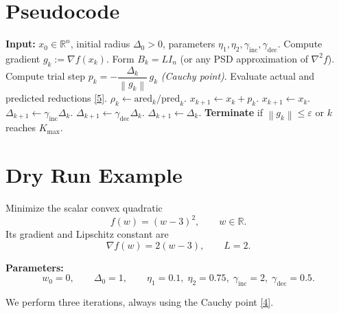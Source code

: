 \documentclass{article}
\newcommand{\norm}[1]{\left\lVert#1\right\rVert}
\newcommand{\R}{\mathbb{R}}
\begin{document}
\section*{Pseudocode}
\begin{algorithm}[H]
\caption{Trust‑Region Gradient Method (TR‑GM)}
\begin{algorithmic}[1]
\STATE \textbf{Input:} $x_{0}\in\R^{n}$, initial radius $\Delta_{0}>0$,
parameters $\eta_{1},\eta_{2},\gamma_{\text{inc}},\gamma_{\text{dec}}$.
    \STATE Compute gradient $g_{k}:=\nabla f(x_{k})$.
    \STATE Form $B_{k}=L I_{n}$ (or any PSD approximation of $\nabla^{2}f$).
    \STATE Compute trial step $p_{k}= -\dfrac{\Delta_{k}}{\norm{g_{k}}}\,g_{k}$
            \hfill\textit{(Cauchy point)}.
    \STATE Evaluate actual and predicted reductions \eqref{5}.
    \STATE $\rho_{k}\gets\text{ared}_{k}/\text{pred}_{k}$.
        \STATE $x_{k+1}\gets x_{k}+p_{k}$.
    \ELSE
        \STATE $x_{k+1}\gets x_{k}$.
    \ENDIF
        \STATE $\Delta_{k+1}\gets\gamma_{\text{inc}}\Delta_{k}$.
        \STATE $\Delta_{k+1}\gets\gamma_{\text{dec}}\Delta_{k}$.
    \ELSE
        \STATE $\Delta_{k+1}\gets\Delta_{k}$.
    \ENDIF
    \STATE \textbf{Terminate} if $\norm{g_{k}}\le\varepsilon$ or $k$ reaches
    $K_{\max}$.
\ENDFOR
\end{algorithmic}
\end{algorithm}

\section*{Dry Run Example}
Minimize the scalar convex quadratic
\[
f(w)=(w-3)^{2},\qquad w\in\R.
\]
Its gradient and Lipschitz constant are
\[
\nabla f(w)=2(w-3),\qquad L=2.
\]

\noindent\textbf{Parameters:}
\[
w_{0}=0,\qquad \Delta_{0}=1,\qquad
\eta_{1}=0.1,\;\eta_{2}=0.75,\;
\gamma_{\text{inc}}=2,\;\gamma_{\text{dec}}=0.5.
\]

We perform three iterations, always using the Cauchy point \eqref{4}.
\end{document}
